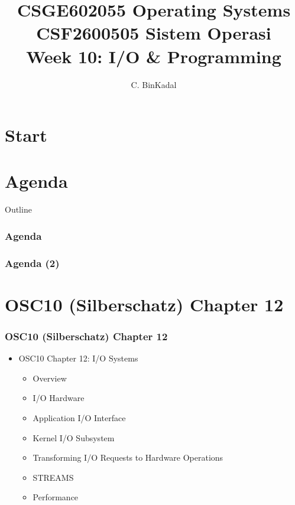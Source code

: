 \documentclass[aspectratio=169, xcolor=table, notheorems, hyperref={pdfpagelabels=false}]{beamer}
\title[\kopikopi]
{CSGE602055 Operating Systems \\ 
CSF2600505 Sistem Operasi \\
Week 10:
I/O \& Programming}
\author{C. BinKadal}
\institute[SdnBhd]
{
Sendirian Berhad\\
\medskip
\url{https://os.vlsm.org/Slides/os10.pdf}
\\ \texttt{Always check for the latest revision!}
}
\date{\revision}
\begin{document}
\lstset{
basicstyle=\ttfamily\tiny, %
breakatwhitespace=true,
language=C,
columns=fullflexible,
keepspaces=true,
breaklines=true,
tabsize=3, 
showstringspaces=false,
extendedchars=true}

\section{Start}
\begin{frame}
\titlepage
\end{frame}




\section{Agenda}
\begin{frame}{Outline}
  \frametitle{Agenda}
  \tableofcontents[sections={1-12}]
\end{frame}
\begin{frame}
   \frametitle{Agenda (2)}
   \tableofcontents[sections={13-}]
\end{frame}




\section{OSC10 (Silberschatz) Chapter 12}
\begin{frame}
\frametitle{OSC10 (Silberschatz) Chapter 12}
  \begin{itemize}
  \item OSC10 Chapter 12: I/O Systems
  \begin{itemize}
  \item Overview
  \item I/O Hardware
  \item Application I/O Interface
  \item Kernel I/O Subsystem
  \item Transforming I/O Requests to Hardware Operations
  \item STREAMS
  \item Performance
  \end{itemize}
  \end{itemize}
  \vfill \null
\end{frame}
\end{document}
